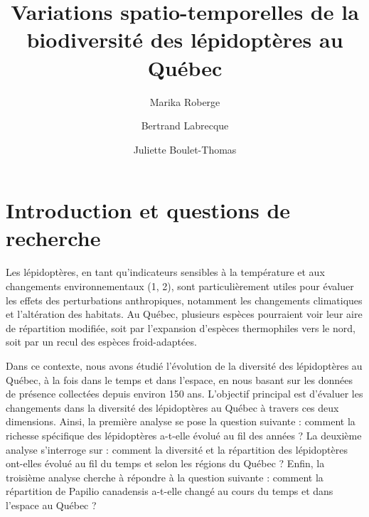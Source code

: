 \documentclass[9pt,twocolumn,twoside,]{pnas-new}
\title{Variations spatio-temporelles de la biodiversité des lépidoptères
au Québec}
\author[a]{Marika Roberge}
\author[a]{Bertrand Labrecque}
\author[a]{Juliette Boulet-Thomas}
\affil[a]{Faculté des sciences, Département de biologie, 2500
Boulevard de l'Université, Sherbrooke, Québec, J1K 2R1}
\begin{document}
\verticaladjustment{-2pt}



\maketitle
\thispagestyle{firststyle}


\acknow{}

\section{Introduction et questions de
recherche}\label{introduction-et-questions-de-recherche}

Les lépidoptères, en tant qu'indicateurs sensibles à la température et
aux changements environnementaux (1, 2), sont particulièrement utiles
pour évaluer les effets des perturbations anthropiques, notamment les
changements climatiques et l'altération des habitats. Au Québec,
plusieurs espèces pourraient voir leur aire de répartition modifiée,
soit par l'expansion d'espèces thermophiles vers le nord, soit par un
recul des espèces froid-adaptées.

Dans ce contexte, nous avons étudié l'évolution de la diversité des
lépidoptères au Québec, à la fois dans le temps et dans l'espace, en
nous basant sur les données de présence collectées depuis environ 150
ans. L'objectif principal est d'évaluer les changements dans la
diversité des lépidoptères au Québec à travers ces deux dimensions.
Ainsi, la première analyse se pose la question suivante : comment la
richesse spécifique des lépidoptères a-t-elle évolué au fil des années ?
La deuxième analyse s'interroge sur : comment la diversité et la
répartition des lépidoptères ont-elles évolué au fil du temps et selon
les régions du Québec ? Enfin, la troisième analyse cherche à répondre à
la question suivante : comment la répartition de Papilio canadensis
a-t-elle changé au cours du temps et dans l'espace au Québec ?
\end{document}
